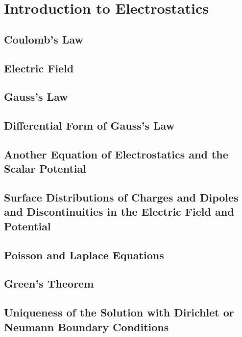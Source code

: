 \setcounter{chapter}{0}
\renewcommand{\thechapter}{1}
\chapter{Introduction to Electrostatics}
\setcounter{equation}{0}	        %

\section{Coulomb's Law}

\section{Electric Field}

\section{Gauss's Law}

\section{Differential Form of Gauss's Law}

\section{Another Equation of Electrostatics and the Scalar Potential}

\section{Surface Distributions of Charges and Dipoles and Discontinuities in the Electric Field and Potential}

\section{Poisson and Laplace Equations}

\section{Green's Theorem}

\section{Uniqueness of the Solution with Dirichlet or Neumann Boundary Conditions}

